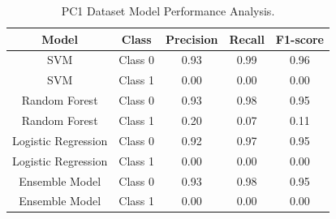 \documentclass[12pt]{report}
\begin{document}
\begin{table}[ht]
    \centering
    \begin{tabular}{|c|c|c|c|c|}
        \hline
        Model               & Class   & Precision & Recall & F1-score \\
        \hline
        SVM                 & Class 0 & 0.93      & 0.99   & 0.96     \\
        SVM                 & Class 1 & 0.00      & 0.00   & 0.00     \\
        \hline
        Random Forest       & Class 0 & 0.93      & 0.98   & 0.95     \\
        Random Forest       & Class 1 & 0.20      & 0.07   & 0.11     \\
        \hline
        Logistic Regression & Class 0 & 0.92      & 0.97   & 0.95     \\
        Logistic Regression & Class 1 & 0.00      & 0.00   & 0.00     \\
        \hline
        Ensemble Model      & Class 0 & 0.93      & 0.98   & 0.95     \\
        Ensemble Model      & Class 1 & 0.00      & 0.00   & 0.00     \\
        \hline
    \end{tabular}
    \caption{PC1 Dataset Model Performance Analysis.}
    \label{tab:PC1 Performance Analysis}
\end{table}



\end{document}
